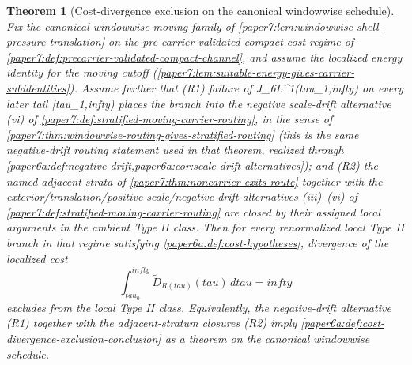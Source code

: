 \documentclass[11pt]{amsart}
\def\({}%
\def\){}%
\def\mathfrak#1{#1}%
\def\tau{tau}%
\def\infty{infty}%
\theoremstyle{plain}
\newtheorem{theorem}{Theorem}[section]
\theoremstyle{definition}
\theoremstyle{remark}
\begin{document}
\begin{theorem}[Cost-divergence exclusion on the canonical windowwise schedule]
\label{paper6a:thm:cost-divergence-exclusion-discharged}
Fix the canonical windowwise moving family of
\cref{paper7:lem:windowwise-shell-pressure-translation} on the pre-carrier
validated compact-cost regime of
\cref{paper7:def:precarrier-validated-compact-channel}, and assume the
localized energy identity for the moving cutoff
(\cref{paper7:lem:suitable-energy-gives-carrier-subidentities}).  Assume
further that
\textup{(R1)} failure of \(J_6\in L^1(\tau_1,\infty)\) on every later tail
\([\tau_1,\infty)\) places the branch into the negative scale-drift
alternative \textup{(vi)} of
\cref{paper7:def:stratified-moving-carrier-routing}, in the sense of
\cref{paper7:thm:windowwise-routing-gives-stratified-routing} (this is the
same negative-drift routing statement used in that theorem,
realized through \cref{paper6a:def:negative-drift,paper6a:cor:scale-drift-alternatives});
and \textup{(R2)} the named adjacent strata of
\cref{paper7:thm:noncarrier-exits-route} together with the
exterior/translation/positive-scale/negative-drift alternatives
\textup{(iii)}--\textup{(vi)} of
\cref{paper7:def:stratified-moving-carrier-routing} are closed by their
assigned local arguments in the ambient Type II class.
Then for every renormalized local Type II branch \(\omega\) in that regime
satisfying \cref{paper6a:def:cost-hypotheses}, divergence of the localized
cost
\[
  \int_{\tau_0}^{\infty}\widetilde{\mathfrak D}_{R(\tau)}(\tau)\,d\tau=\infty
\]
excludes \(\omega\) from the local Type II class.  Equivalently, the
negative-drift alternative \textup{(R1)} together with the adjacent-stratum
closures \textup{(R2)} imply
\cref{paper6a:def:cost-divergence-exclusion-conclusion} as a theorem on the canonical
windowwise schedule.
\end{theorem}
\end{document}
